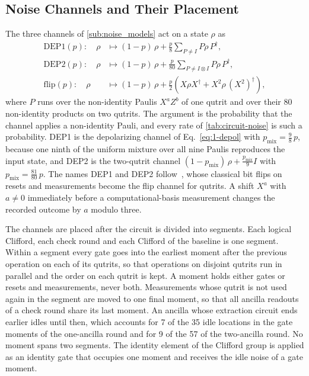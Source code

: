 \subsection{Noise Channels and Their Placement}
\label{app:rounds-noise}\label{app:rounds-protocol}

The three channels of \autoref{sub:noise_models} act on a state $\rho$ as
\begin{align}
    \mathrm{DEP1}(p)\colon\quad \rho &\mapsto (1-p)\,\rho + \frac{p}{8}\sum_{P \neq I} P \rho\, P^\dagger , \\
    \mathrm{DEP2}(p)\colon\quad \rho &\mapsto (1-p)\,\rho + \frac{p}{80}\sum_{P \neq I \otimes I} P \rho\, P^\dagger ,
    \label{eq:2-depol} \\
    \mathrm{flip}(p)\colon\quad \rho &\mapsto (1-p)\,\rho + \frac{p}{2}\left( X \rho X^\dagger + X^2 \rho\, (X^2)^\dagger \right) ,
    \label{eq:flip-channel}
\end{align}
where $P$ runs over the non-identity Paulis $X^a Z^b$ of one qutrit and over their $80$ non-identity products on two qutrits. The argument is the probability that the channel applies a non-identity Pauli, and every rate of \autoref{tab:circuit-noise} is such a probability. DEP1 is the depolarizing channel of Eq.~\eqref{eq:1-depol} with $p_{\mathrm{mix}} = \tfrac{9}{8}\,p$, because one ninth of the uniform mixture over all nine Paulis reproduces the input state, and DEP2 is the two-qutrit channel $(1-p_{\mathrm{mix}})\,\rho + \tfrac{p_{\mathrm{mix}}}{9} I$ with $p_{\mathrm{mix}} = \tfrac{81}{80}\,p$. The names DEP1 and DEP2 follow~\cite{GidneyHoneycomb2021}, whose classical bit flips on resets and measurements become the flip channel for qutrits. A shift $X^a$ with $a \neq 0$ immediately before a computational-basis measurement changes the recorded outcome by $a$ modulo three.

The channels are placed after the circuit is divided into segments. Each logical Clifford, each check round and each Clifford of the baseline is one segment. Within a segment every gate goes into the earliest moment after the previous operation on each of its qutrits, so that operations on disjoint qutrits run in parallel and the order on each qutrit is kept. A moment holds either gates or resets and measurements, never both. Measurements whose qutrit is not used again in the segment are moved to one final moment, so that all ancilla readouts of a check round share its last moment. An ancilla whose extraction circuit ends earlier idles until then, which accounts for 7 of the 35 idle locations in the gate moments of the one-ancilla round and for 9 of the 57 of the two-ancilla round. No moment spans two segments. The identity element of the Clifford group is applied as an identity gate that occupies one moment and receives the idle noise of a gate moment.

